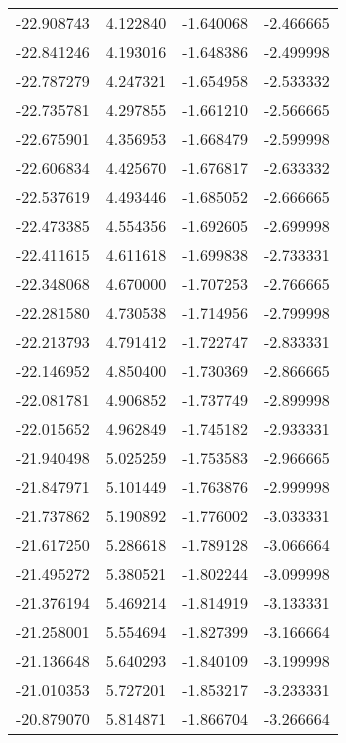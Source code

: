 \begin{tabular}{rrrr}
      -22.908743 &         4.122840 &   -1.640068 &  -2.466665 \\
      -22.841246 &         4.193016 &   -1.648386 &  -2.499998 \\
      -22.787279 &         4.247321 &   -1.654958 &  -2.533332 \\
      -22.735781 &         4.297855 &   -1.661210 &  -2.566665 \\
      -22.675901 &         4.356953 &   -1.668479 &  -2.599998 \\
      -22.606834 &         4.425670 &   -1.676817 &  -2.633332 \\
      -22.537619 &         4.493446 &   -1.685052 &  -2.666665 \\
      -22.473385 &         4.554356 &   -1.692605 &  -2.699998 \\
      -22.411615 &         4.611618 &   -1.699838 &  -2.733331 \\
      -22.348068 &         4.670000 &   -1.707253 &  -2.766665 \\
      -22.281580 &         4.730538 &   -1.714956 &  -2.799998 \\
      -22.213793 &         4.791412 &   -1.722747 &  -2.833331 \\
      -22.146952 &         4.850400 &   -1.730369 &  -2.866665 \\
      -22.081781 &         4.906852 &   -1.737749 &  -2.899998 \\
      -22.015652 &         4.962849 &   -1.745182 &  -2.933331 \\
      -21.940498 &         5.025259 &   -1.753583 &  -2.966665 \\
      -21.847971 &         5.101449 &   -1.763876 &  -2.999998 \\
      -21.737862 &         5.190892 &   -1.776002 &  -3.033331 \\
      -21.617250 &         5.286618 &   -1.789128 &  -3.066664 \\
      -21.495272 &         5.380521 &   -1.802244 &  -3.099998 \\
      -21.376194 &         5.469214 &   -1.814919 &  -3.133331 \\
      -21.258001 &         5.554694 &   -1.827399 &  -3.166664 \\
      -21.136648 &         5.640293 &   -1.840109 &  -3.199998 \\
      -21.010353 &         5.727201 &   -1.853217 &  -3.233331 \\
      -20.879070 &         5.814871 &   -1.866704 &  -3.266664 \\

\end{tabular}

